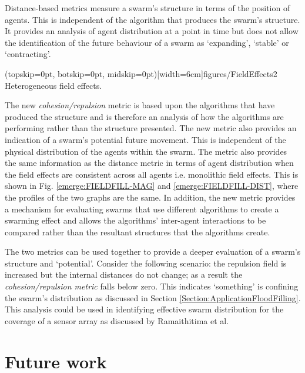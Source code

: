 \documentclass{ieeeaccess}
\begin{document}
Distance-based metrics measure a swarm's structure in terms of the position of
agents. This is independent of the algorithm that produces the swarm's
structure. It provides an analysis of agent distribution at a point in time but
does not allow the identification of the future behaviour of a swarm as
`expanding', `stable' or `contracting'. 

\Figure[t!](topskip=0pt, botskip=0pt, midskip=0pt)[width=6cm]{figures/FieldEffects2}
{Heterogeneous field effects.\label{additional:fieldsWork}}

The new \textit{cohesion/repulsion} metric is based upon the algorithms that
have produced the structure and is therefore an analysis of how the algorithms
are performing rather than the structure presented. The new metric also
provides an indication of a swarm's potential future movement. This is
independent of the physical distribution of the agents within the swarm. The
metric also provides the same information as the distance metric in terms of
agent distribution when the field effects are consistent across all agents i.e.
monolithic field effects. This is shown in Fig. \ref{emerge:FIELDFILL-MAG} and
\ref{emerge:FIELDFILL-DIST}, where the profiles of the two graphs are the same.
In addition, the new metric provides a mechanism for evaluating swarms that use
different algorithms to create a swarming effect and allows the algorithms'
inter-agent interactions to be compared rather than the resultant structures
that the algorithms create. 

The two metrics can be used together to provide a deeper evaluation of a
swarm's structure and `potential'. Consider the following scenario: the
repulsion field is increased but the internal distances do not change; as a
result the \textit{cohesion/repulsion metric} falls below zero. This indicates
`something' is confining the swarm's distribution as discussed in Section
\ref{Section:ApplicationFloodFilling}. This analysis could be used in
identifying effective swarm distribution for the coverage of a sensor array as
discussed by Ramaithitima et al.~\cite{RWBK:15}


\section{Future work}\label{Section:FutureWork}
\end{document}
